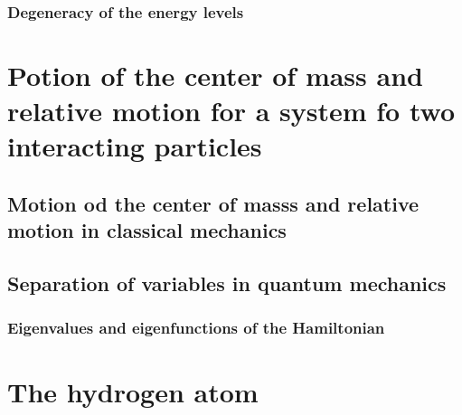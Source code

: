 \subsubsection{Degeneracy of the energy levels}

\section{Potion of the center of mass and relative motion for a system fo two interacting particles}

\subsection{Motion od the center of masss and relative motion in classical mechanics}

\subsection{Separation of variables in quantum mechanics}
\subsubsection{Eigenvalues and eigenfunctions of the Hamiltonian}

\section{The hydrogen atom}
